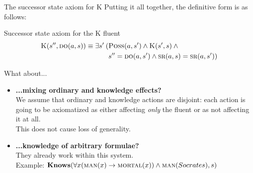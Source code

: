 \begin{frame}{The successor state axiom for K}
    Putting it all together, the definitive form is as follows:

    \begin{block}{Successor state axiom for the K fluent}
        \vspace{-0.5cm}
        \begin{align*}
            \textsc{K}(s'', \textsc{do}(a, s)) \equiv \exists s' \: (&\textsc{Poss}(a, s') \land \textsc{K}(s',s) \: \land \\
            & s'' = \textsc{do}(a, s') \land \textsc{sr}(a, s) = \textsc{sr}(a, s'))
        \end{align*}
    \end{block}
\end{frame}

\begin{frame}{What about...}
    \begin{itemize}
        \item \textbf{...mixing ordinary and knowledge effects?} \\
            We assume that ordinary and knowledge actions are disjoint:
            each action is going to be axiomatized
            as either affecting \emph{only} the \sck{} fluent
            or as not affecting it at all. \\
            This does not cause loss of generality.
        \item \textbf{...knowledge of arbitrary formulae?} \\
            They already work within this system. \\
            Example: \( \textbf{Knows}(\forall x (\textsc{man}(x) \rightarrow \textsc{mortal}(x)) \land \textsc{man}(Socrates), s) \)
    \end{itemize}
\end{frame}

